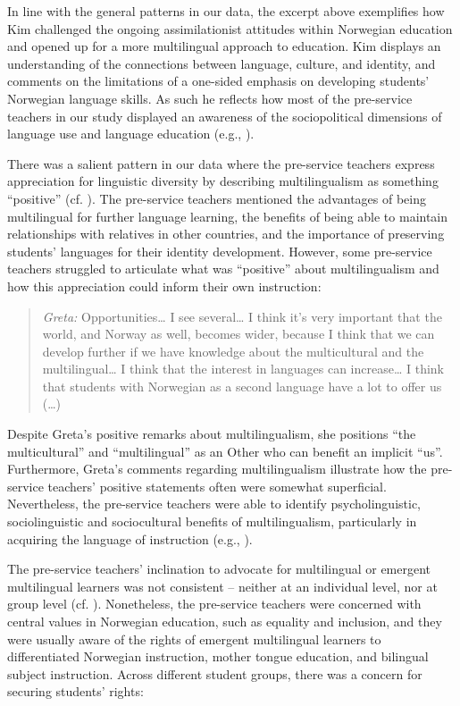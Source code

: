 \documentclass[output=paper]{langscibook}
\begin{document}
In line with the general patterns in our data, the excerpt above exemplifies how Kim challenged the ongoing assimilationist attitudes within Norwegian education and opened up for a more multilingual approach to education. Kim displays an understanding of the connections between language, culture, and identity, and comments on the limitations of a one-sided emphasis on developing students’ Norwegian language skills. As such he reflects how most of the pre-service teachers in our study displayed an awareness of the sociopolitical dimensions of language use and language education (e.g., \citealt{LucasVillegas2013}).

There was a salient pattern in our data where the pre-service teachers express appreciation for linguistic diversity by describing multilingualism as something “positive” (cf. \citealt{chapters/5_ostergaard}). The pre-service teachers mentioned the advantages of being multilingual for further language learning, the benefits of being able to maintain relationships with relatives in other countries, and the importance of preserving students’ languages for their identity development. However, some pre-service teachers struggled to articulate what was “positive” about multilingualism and how this appreciation could inform their own instruction: 

\begin{quote}
\emph{Greta:} Opportunities… I see several… I think it’s very important that the world, and Norway as well, becomes wider, because I think that we can develop further if we have knowledge about the multicultural and the multilingual… I think that the interest in languages can increase… I think that students with Norwegian as a second language have a lot to offer us (…)
\end{quote}

Despite Greta’s positive remarks about multilingualism, she positions “the multicultural” and “multilingual” as an Other who can benefit an implicit “us”. Furthermore, Greta’s comments regarding multilingualism illustrate how the pre-service teachers’ positive statements often were somewhat superficial. Nevertheless, the pre-service teachers were able to identify psycholinguistic, sociolinguistic and sociocultural benefits of multilingualism, particularly in acquiring the language of instruction (e.g., \citealt{LucasVillegas2013}).

The pre-service teachers’ inclination to advocate for multilingual or emergent multilingual learners was not consistent – neither at an individual level, nor at group level (cf. \citealt{chapters/5_ostergaard}). Nonetheless, the pre-service teachers were concerned with central values in Norwegian education, such as equality and inclusion, and they were usually aware of the rights of emergent multilingual learners to differentiated Norwegian instruction, mother tongue education, and bilingual subject instruction. Across different student groups, there was a concern for securing students’ rights:
\end{document}
